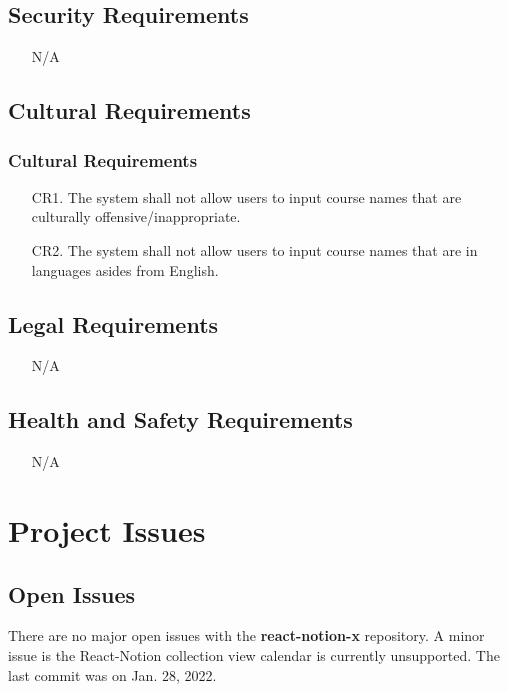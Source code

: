 \documentclass[12pt, titlepage]{article}
\begin{document}
\subsection{Security Requirements}

\begin{itemize}
  \item[] N/A
\end{itemize}

\subsection{Cultural Requirements}

\subsubsection{Cultural Requirements}

\begin{itemize}
  \item[CR1.] The system shall not allow users to input course names that are culturally offensive/inappropriate. 
  \item[CR2.] The system shall not allow users to input course names that are in languages asides from English. 
\end{itemize}

\subsection{Legal Requirements}

\begin{itemize}
  \item[] N/A
\end{itemize}

\subsection{Health and Safety Requirements}

\begin{itemize}
  \item[] N/A
\end{itemize}

\section{Project Issues}

\subsection{Open Issues}
There are no major open issues with the \textbf{react-notion-x} repository. A minor issue is the React-Notion collection view calendar is currently unsupported. The last commit was on Jan. 28, 2022.
\end{document}
